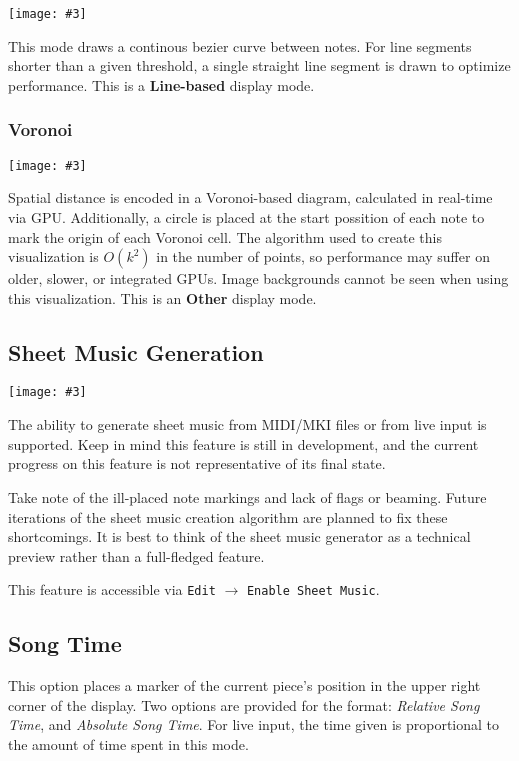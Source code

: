 \documentclass[english]{article}
\makeatletter
\newenvironment{restoretext}%
    {\@parboxrestore%
     \begin{adjustwidth}{}{\leftmargin}%
    }{\end{adjustwidth}
     }
\def\rcbegin{\begin{restoretext}\centering}
\def\rcend{\end{restoretext}}
\newcommand{\rcgnc}[3][]{
  \rcbegin
    \texttt{[image: \#3]}
  \rcend
  \vspace{1em}
}
\providecommand{\mi}[1]{\texttt{#1}}
\makeatother
\begin{document}
\rcgnc{0.86}{image/line.png}

This mode draws a continous bezier curve between notes. For line segments shorter than a given threshold,
a single straight line segment is drawn to optimize performance.
This is a \textbf{Line-based} display mode.


\subsubsection{Voronoi}

\rcgnc{0.86}{image/voronoi.png}

Spatial distance is encoded in a Voronoi-based diagram, calculated in real-time via GPU. Additionally, a circle
is placed at the start possition of each note to mark the origin of each Voronoi cell. The algorithm used to 
create this visualization is $O(k^2)$ in the number of points, so performance may suffer on older, slower, or 
integrated GPUs. Image backgrounds cannot be seen when using this visualization.
This is an \textbf{Other} display mode.

\newpage

\subsection{Sheet Music Generation}

\rcgnc{1.0}{image/sheet.png}

The ability to generate sheet music from MIDI/MKI files or from live input is supported.
Keep in mind this feature is still in development, and the current progress on this feature
is not representative of its final state.

Take note of the ill-placed note markings and lack of flags or beaming. Future iterations of the
sheet music creation algorithm are planned to fix these shortcomings. It is best to think of the
sheet music generator as a technical preview rather than a full-fledged feature.

This feature is accessible via \mi{Edit} $\rightarrow$ \mi{Enable Sheet Music}.

\subsection{Song Time}

This option places a marker of the current piece's position in the upper right corner of the display.
Two options are provided for the format: \textit{Relative Song Time}, and \textit{Absolute Song Time}.
For live input, the time given is proportional to the amount of time spent in this mode.
\end{document}

